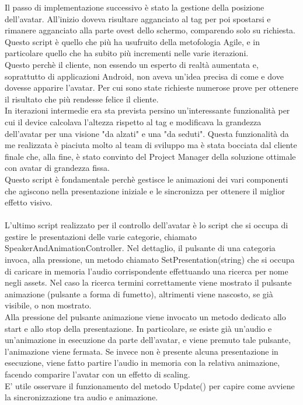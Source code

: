 Il passo di implementazione successivo \`e stato la gestione della posizione dell'avatar. All'inizio doveva risultare agganciato al tag per poi spostarsi e rimanere agganciato alla parte ovest dello schermo, comparendo solo su richiesta.\\
Questo script \`e quello che pi\`u ha usufruito della metofologia Agile, e in particolare quello che ha subito pi\`u incrementi nelle varie iterazioni.\\
Questo perch\`e il cliente, non essendo un esperto di realt\`a aumentata e, soprattutto di applicazioni Android, non aveva un'idea precisa di come e dove dovesse apparire l'avatar. Per cui sono state richieste numerose prove per ottenere il risultato che pi\`u rendesse felice il cliente.\\
In iterazioni intermedie era sta prevista persino un'interessante funzionalit\`a per cui il device calcolava l'altezza rispetto al tag e modificava la grandezza dell'avatar per una visione "da alzati" e una "da seduti". Questa funzionalit\`a da me realizzata \`e piaciuta molto al team di sviluppo ma \`e stata bocciata dal cliente finale che, alla fine, \`e stato convinto del Project Manager della soluzione ottimale con avatar di grandezza fissa.\\
Questo script \`e fondamentale perch\`e gestisce le animazioni dei vari componenti che agiscono nella presentazione iniziale e le sincronizza per ottenere il miglior effetto visivo.\\\\

L'ultimo script realizzato per il controllo dell'avatar \`e lo script che si occupa di gestire le presentazioni delle varie categorie, chiamato SpeakerAndAnimationController. Nel dettaglio, il pulsante di una categoria invoca, alla pressione, un metodo chiamato SetPresentation(string) che si occupa di caricare in memoria l'audio corrispondente effettuando una ricerca per nome negli assets. Nel caso la ricerca termini correttamente viene mostrato il pulsante animazione (pulsante a forma di fumetto), altrimenti viene nascosto, se gi\`a visibile, o non mostrato.\\
Alla pressione del pulsante animazione viene invocato un metodo dedicato allo start e allo stop della presentazione. In particolare, se esiste gi\`a un'audio e un'animazione in esecuzione da parte dell'avatar, e viene premuto tale pulsante, l'animazione viene fermata. Se invece  non \`e presente alcuna presentazione in esecuzione, viene fatto partire l'audio in memoria con la relativa animazione, facendo comparire l'avatar con un effetto di scaling.\\
E' utile osservare il funzionamento del metodo Update() per capire come avviene la sincronizzazione tra audio e animazione.

